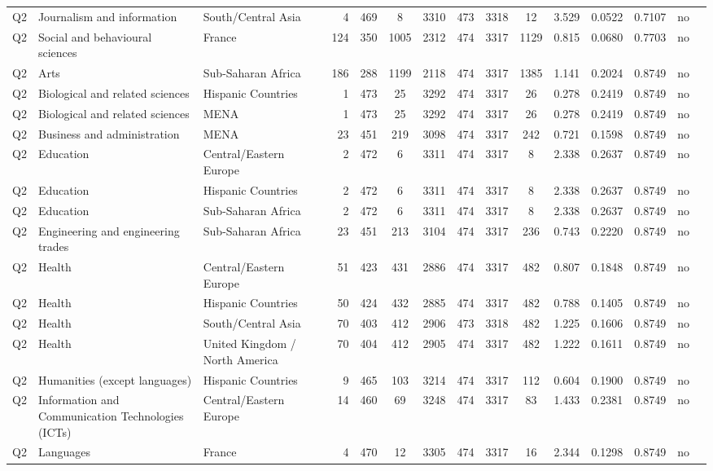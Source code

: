 \begin{longtable}{lllrcccccccccll}
Q2 & Journalism and information & South/Central Asia & 4 & 469 & 8 & 3310 & 473 & 3318 & 12 & 3.529 & 0.0522 & 0.7107 & no \\
Q2 & Social and behavioural sciences & France & 124 & 350 & 1005 & 2312 & 474 & 3317 & 1129 & 0.815 & 0.0680 & 0.7703 & no \\
Q2 & Arts & Sub-Saharan Africa & 186 & 288 & 1199 & 2118 & 474 & 3317 & 1385 & 1.141 & 0.2024 & 0.8749 & no \\
Q2 & Biological and related sciences & Hispanic Countries & 1 & 473 & 25 & 3292 & 474 & 3317 & 26 & 0.278 & 0.2419 & 0.8749 & no \\
Q2 & Biological and related sciences & MENA & 1 & 473 & 25 & 3292 & 474 & 3317 & 26 & 0.278 & 0.2419 & 0.8749 & no \\
Q2 & Business and administration & MENA & 23 & 451 & 219 & 3098 & 474 & 3317 & 242 & 0.721 & 0.1598 & 0.8749 & no \\
Q2 & Education & Central/Eastern Europe & 2 & 472 & 6 & 3311 & 474 & 3317 & 8 & 2.338 & 0.2637 & 0.8749 & no \\
Q2 & Education & Hispanic Countries & 2 & 472 & 6 & 3311 & 474 & 3317 & 8 & 2.338 & 0.2637 & 0.8749 & no \\
Q2 & Education & Sub-Saharan Africa & 2 & 472 & 6 & 3311 & 474 & 3317 & 8 & 2.338 & 0.2637 & 0.8749 & no \\
Q2 & Engineering and engineering trades & Sub-Saharan Africa & 23 & 451 & 213 & 3104 & 474 & 3317 & 236 & 0.743 & 0.2220 & 0.8749 & no \\
Q2 & Health & Central/Eastern Europe & 51 & 423 & 431 & 2886 & 474 & 3317 & 482 & 0.807 & 0.1848 & 0.8749 & no \\
Q2 & Health & Hispanic Countries & 50 & 424 & 432 & 2885 & 474 & 3317 & 482 & 0.788 & 0.1405 & 0.8749 & no \\
Q2 & Health & South/Central Asia & 70 & 403 & 412 & 2906 & 473 & 3318 & 482 & 1.225 & 0.1606 & 0.8749 & no \\
Q2 & Health & United Kingdom / North America & 70 & 404 & 412 & 2905 & 474 & 3317 & 482 & 1.222 & 0.1611 & 0.8749 & no \\
Q2 & Humanities (except languages) & Hispanic Countries & 9 & 465 & 103 & 3214 & 474 & 3317 & 112 & 0.604 & 0.1900 & 0.8749 & no \\
Q2 & Information and Communication Technologies (ICTs) & Central/Eastern Europe & 14 & 460 & 69 & 3248 & 474 & 3317 & 83 & 1.433 & 0.2381 & 0.8749 & no \\
Q2 & Languages & France & 4 & 470 & 12 & 3305 & 474 & 3317 & 16 & 2.344 & 0.1298 & 0.8749 & no \\

\end{longtable}
